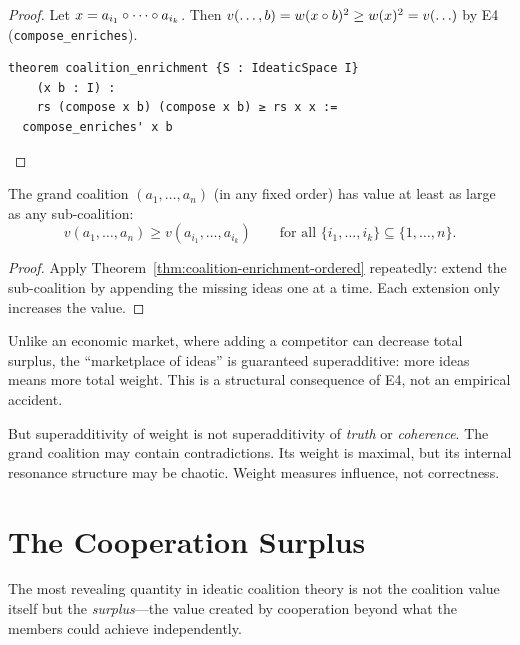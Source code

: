 \begin{proof}
Let $x = a_{i_1} \circ \cdots \circ a_{i_k}$.  Then
$v(\ldots, b) = w(x \circ b)^2 \geq w(x)^2 = v(\ldots)$
by E4 (\texttt{compose\_enriches}).

\begin{lstlisting}[caption={Lean 4: Coalition enrichment}]
theorem coalition_enrichment {S : IdeaticSpace I}
    (x b : I) :
    rs (compose x b) (compose x b) ≥ rs x x :=
  compose_enriches' x b
\end{lstlisting}
\end{proof}

\begin{corollary}
\label{cor:grand-coalition-ordered}
The grand coalition $(a_1, \ldots, a_n)$ (in any fixed order) has value at
least as large as any sub-coalition:
\[
  v(a_1, \ldots, a_n) \geq v(a_{i_1}, \ldots, a_{i_k})
  \qquad \text{for all } \{i_1, \ldots, i_k\} \subseteq \{1, \ldots, n\}.
\]
\end{corollary}

\begin{proof}
Apply Theorem~\ref{thm:coalition-enrichment-ordered} repeatedly: extend the
sub-coalition by appending the missing ideas one at a time.  Each extension
only increases the value.
\end{proof}

\begin{interpretation}
\label{interp:superadditive}
Unlike an economic market, where adding a competitor can decrease total
surplus, the ``marketplace of ideas'' is guaranteed superadditive: more ideas
means more total weight.  This is a structural consequence of E4, not an
empirical accident.

But superadditivity of weight is not superadditivity of \emph{truth} or
\emph{coherence}.  The grand coalition may contain contradictions.  Its weight
is maximal, but its internal resonance structure may be chaotic.  Weight
measures influence, not correctness.
\end{interpretation}


\section{The Cooperation Surplus}

The most revealing quantity in ideatic coalition theory is not the coalition
value itself but the \emph{surplus}---the value created by cooperation
beyond what the members could achieve independently.

